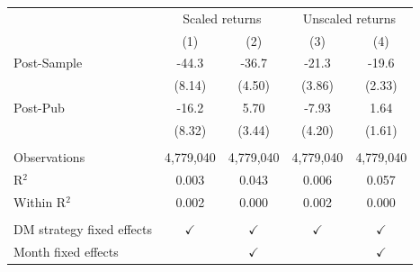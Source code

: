 
\begingroup
\centering
\begin{tabular}{lcccc}
   \toprule
    & \multicolumn{2}{c}{Scaled returns} & \multicolumn{2}{c}{Unscaled returns} \\ 
                             & (1)           & (2)           & (3)           & (4)\\  
   \midrule 
   Post-Sample               & -44.3         & -36.7         & -21.3         & -19.6\\   
                             & (8.14)        & (4.50)        & (3.86)        & (2.33)\\   
   Post-Pub                  & -16.2         & 5.70          & -7.93         & 1.64\\   
                             & (8.32)        & (3.44)        & (4.20)        & (1.61)\\   
    \\
   Observations              & 4,779,040     & 4,779,040     & 4,779,040     & 4,779,040\\  
   R$^2$                     & 0.003         & 0.043         & 0.006         & 0.057\\  
   Within R$^2$              & 0.002         & 0.000         & 0.002         & 0.000\\  
    \\
   DM strategy fixed effects & $\checkmark$  & $\checkmark$  & $\checkmark$  & $\checkmark$\\   
   Month fixed effects       &               & $\checkmark$  &               & $\checkmark$\\   
   \bottomrule
\end{tabular}
\par\endgroup


